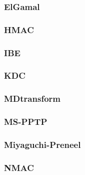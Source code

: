 \begin{frame}\frametitle{ElGamal}
\begin{figure}
\begin{center}

\end{center}
\end{figure}
\end{frame}
\begin{frame}\frametitle{HMAC}
\begin{figure}
\begin{center}

\end{center}
\end{figure}
\end{frame}
\begin{frame}\frametitle{IBE}
\begin{figure}
\begin{center}

\end{center}
\end{figure}
\end{frame}
\begin{frame}\frametitle{KDC}
\begin{figure}
\begin{center}

\end{center}
\end{figure}
\end{frame}
\begin{frame}\frametitle{MDtransform}
\begin{figure}
\begin{center}

\end{center}
\end{figure}
\end{frame}
\begin{frame}\frametitle{MS-PPTP}
\begin{figure}
\begin{center}

\end{center}
\end{figure}
\end{frame}
\begin{frame}\frametitle{Miyaguchi-Preneel}
\begin{figure}
\begin{center}

\end{center}
\end{figure}
\end{frame}
\begin{frame}\frametitle{NMAC}
\begin{figure}
\begin{center}

\end{center}
\end{figure}
\end{frame}
